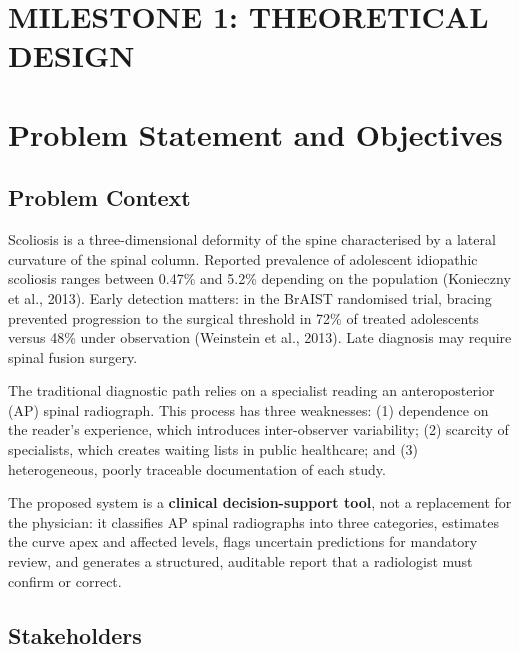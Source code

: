 \documentclass[12pt,a4paper]{article}
\begin{document}
\newpage
\section*{MILESTONE 1: THEORETICAL DESIGN}

\section{Problem Statement and Objectives}

\subsection{Problem Context}

Scoliosis is a three-dimensional deformity of the spine characterised by a lateral curvature of the
spinal column. Reported prevalence of adolescent idiopathic scoliosis ranges between 0.47\% and 5.2\%
depending on the population (Konieczny et al., 2013). Early detection matters: in the BrAIST
randomised trial, bracing prevented progression to the surgical threshold in 72\% of treated
adolescents versus 48\% under observation (Weinstein et al., 2013). Late diagnosis may require
spinal fusion surgery.

The traditional diagnostic path relies on a specialist reading an anteroposterior (AP) spinal
radiograph. This process has three weaknesses: (1) dependence on the reader's experience, which
introduces inter-observer variability; (2) scarcity of specialists, which creates waiting lists in
public healthcare; and (3) heterogeneous, poorly traceable documentation of each study.

The proposed system is a \textbf{clinical decision-support tool}, not a replacement for the physician:
it classifies AP spinal radiographs into three categories, estimates the curve apex and affected
levels, flags uncertain predictions for mandatory review, and generates a structured, auditable report
that a radiologist must confirm or correct.

\subsection{Stakeholders}
\end{document}
